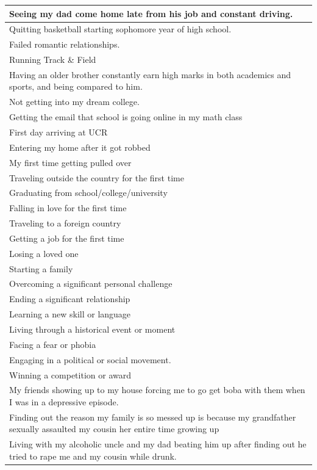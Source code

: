 \documentclass[
  .7em,
  letterpaper,
  DIV=11,
  numbers=noendperiod]{scrartcl}
\begin{document}
\begin{table}
\begin{tabular}{l}
\hline
Seeing my dad come home late from his job and constant driving.\\
\hline
Quitting basketball starting sophomore year of high school.\\
\hline
Failed romantic relationships.\\
\hline
Running Track \& Field\\
\hline
Having an older brother constantly earn high marks in both academics and sports, and being compared to him.\\
\hline
Not getting into my dream college.\\
\hline
Getting the email that school is going online in my math class\\
\hline
First day arriving at UCR\\
\hline
Entering my home after it got robbed\\
\hline
My first time getting pulled over\\
\hline
Traveling outside the country for the first time\\
\hline
Graduating from school/college/university\\
\hline
Falling in love for the first time\\
\hline
Traveling to a foreign country\\
\hline
Getting a job for the first time\\
\hline
Losing a loved one\\
\hline
Starting a family\\
\hline
Overcoming a significant personal challenge\\
\hline
Ending a significant relationship\\
\hline
Learning a new skill or language\\
\hline
Living through a historical event or moment\\
\hline
Facing a fear or phobia\\
\hline
Engaging in a political or social movement.\\
\hline
Winning a competition or award\\
\hline
My friends showing up to my house forcing me to go get boba with them when I was in a depressive episode.\\
\hline
Finding out the reason my family is so messed up is because my grandfather sexually assaulted my cousin her entire time growing up\\
\hline
Living with my alcoholic uncle and my dad beating him up after finding out he tried to rape me and my cousin while drunk.\\

\end{tabular}
\end{table}
\end{document}
